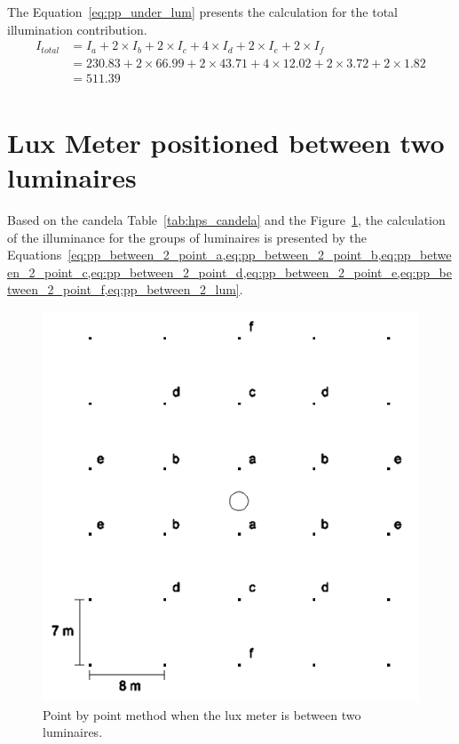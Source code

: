 The Equation~\ref{eq:pp_under_lum} presents the calculation for the total illumination contribution.
\begin{equation}
\begin{split}
I_{total} &= I_a + 2 \times I_b + 2 \times I_c + 4 \times I_d + 2 \times I_e + 2 \times I_f \\
 &= 230.83 + 2 \times 66.99 + 2 \times 43.71 + 4 \times 12.02 + 2 \times 3.72 + 2 \times 1.82 \\
 & = 511.39 \\
\end{split}
\label{eq:pp_under_lum}
\end{equation}

\section{Lux Meter positioned between two luminaires}
Based on the candela Table~\ref{tab:hps_candela} and the Figure~\ref{fig:pp_between_2_lum}, the calculation of the illuminance for the groups of luminaires is presented by the Equations~\cref{eq:pp_between_2_point_a,eq:pp_between_2_point_b,eq:pp_between_2_point_c,eq:pp_between_2_point_d,eq:pp_between_2_point_e,eq:pp_between_2_point_f,eq:pp_between_2_lum}.

\begin{figure}[h!]
\centering
\includegraphics[width=.5\textwidth]{./figs/pp_between_2_lum.png}
\caption{Point by point method when the lux meter is between two luminaires.}
\label{fig:pp_between_2_lum}
\end{figure}

